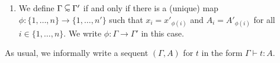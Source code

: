 \begin{definition}
\begin{enumerate}
\item
\label{definition-context-lambda-08}
We define $\Gamma \subseteqsim \Gamma'$ if and only if
there is a (unique) map $\phi:\{1,\ldots,n\} \rightarrow \{1,\ldots,n'\}$
such that $x_{i}=x'_{\phi(i)}$ and $A_{i}=A'_{\phi(i)}$ for all $i \in \{1,\ldots,n\}$. We write $\phi:\Gamma \rightarrow \Gamma'$ in this case.

\end{enumerate}
As usual, we informally write a sequent $(\Gamma, A)$ for $t$
in the form $\Gamma \vdash t:A$.
\end{definition}








%
%
%
%
%



